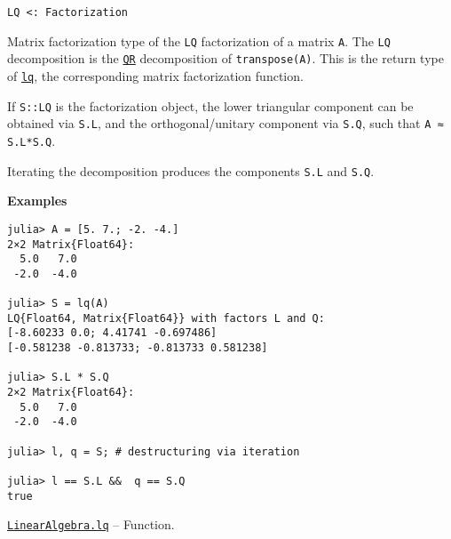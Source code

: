 \begin{adjustwidth}{2em}{0pt}


\begin{verbatim}
LQ <: Factorization
\end{verbatim}

Matrix factorization type of the \texttt{LQ} factorization of a matrix \texttt{A}. The \texttt{LQ} decomposition is the \hyperlink{16913872014958777367}{\texttt{QR}} decomposition of \texttt{transpose(A)}. This is the return type of \hyperlink{1096124289761034610}{\texttt{lq}}, the corresponding matrix factorization function.

If \texttt{S::LQ} is the factorization object, the lower triangular component can be obtained via \texttt{S.L}, and the orthogonal/unitary component via \texttt{S.Q}, such that \texttt{A ≈ S.L*S.Q}.

Iterating the decomposition produces the components \texttt{S.L} and \texttt{S.Q}.

\textbf{Examples}


\begin{verbatim}
julia> A = [5. 7.; -2. -4.]
2×2 Matrix{Float64}:
  5.0   7.0
 -2.0  -4.0

julia> S = lq(A)
LQ{Float64, Matrix{Float64}} with factors L and Q:
[-8.60233 0.0; 4.41741 -0.697486]
[-0.581238 -0.813733; -0.813733 0.581238]

julia> S.L * S.Q
2×2 Matrix{Float64}:
  5.0   7.0
 -2.0  -4.0

julia> l, q = S; # destructuring via iteration

julia> l == S.L &&  q == S.Q
true
\end{verbatim}



\end{adjustwidth}
\hypertarget{1096124289761034610}{}
\hyperlink{1096124289761034610}{\texttt{LinearAlgebra.lq}}  -- {Function.}

